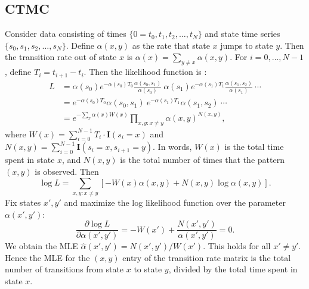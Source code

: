 \documentclass[review,letterpaper,11pt]{elsarticle}
\begin{document}
\subsection{CTMC}
\label{sect:ctmcmle}
Consider data consisting of times $\{0=t_0, t_1, t_2, \ldots,t_N\}$ and state time series $\{s_0,s_1,s_2,\ldots, s_N \}$. Define $\alpha(x,y)$ as the rate that state $x$ jumps to state $y$.  Then the transition rate out of state $x$ is $\alpha(x) = \sum_{y \neq x} \alpha(x,y)$.  For $i = 0, \ldots, N-1$, define $T_i = t_{i+1} - t_i$.  Then the likelihood function is \cite{Guttorp}:
\begin{align*}
L &= \alpha(s_0) e^{-\alpha(s_0) T_0} \frac{\alpha(s_0,s_1)}{\alpha(s_0)} \ \alpha(s_1) e^{-\alpha(s_1) T_1} \frac{\alpha(s_1,s_2)}{\alpha(s_1)} \ \cdots \\
& =  e^{-\alpha(s_0) T_0} \alpha(s_0,s_1) \ e^{-\alpha(s_1) T_1} \alpha(s_1,s_2) \ \cdots \\
& = e^{-\sum_x \alpha(x) W(x)} \prod_{x, y: x\neq y} \alpha(x,y)^{N(x,y)},
\end{align*}
where $W(x) = \sum_{i=0}^{N-1} T_i \cdot \textbf{I}\left(s_i = x\right)$ and
$N(x,y) = \sum_{i=0}^{N-1} \textbf{I}(s_i= x, s_{i+1}=y)$.  In words, $W(x)$ is the total time spent in state $x$, and $N(x,y)$ is the total number of times that the pattern $(x,y)$ is observed.  Then
$$
\log L  = \sum_{x,y: x\neq y}[ -W(x) \alpha(x,y)+N(x,y)\log \alpha(x,y)].
$$
Fix states $x',y'$ and maximize the log likelihood function over the parameter $\alpha(x',y')$:
$$
\frac{\partial \log L}{\partial \alpha(x',y')}  = -W(x') + \frac{N(x',y')}{\alpha(x',y')}= 0.
$$
We obtain the MLE $\widehat{\alpha}(x',y') =  N(x',y') / {W(x')}$.
This holds for all $x' \neq y'$.  Hence the MLE for the $(x,y)$ entry of the transition rate matrix is the total number of transitions from state $x$ to state $y$, divided by the total time spent in state $x$.




\end{document}
